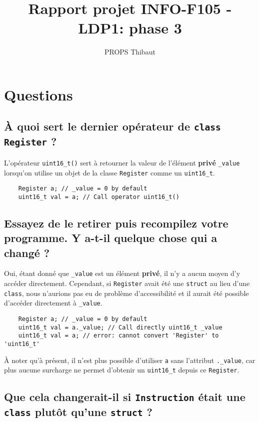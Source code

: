 \documentclass{article}
\title{Rapport projet INFO-F105 - LDP1: phase 3}
\author{PROPS Thibaut}
\date{}
\begin{document}
\maketitle

\section{Questions}

\subsection{À quoi sert le dernier opérateur de \texttt{class Register} ?}

L'opérateur \texttt{uint16_t()} sert à retourner la valeur de l'élément \textbf{privé} \texttt{\_value} lorsqu'on utilise un objet de la classe \texttt{Register} comme un \texttt{uint16_t}.

\begin{verbatim}
    Register a; // _value = 0 by default
    uint16_t val = a; // Call operator uint16_t()
\end{verbatim}

\subsection{Essayez de le retirer puis recompilez votre programme. Y a-t-il quelque chose qui a changé ?}

Oui, étant donné que \texttt{\_value} est un élément \textbf{privé}, il n'y a aucun moyen d'y accéder directement. Cependant, si \texttt{Register} avait été une \texttt{struct} au lieu d'une \texttt{class}, nous n'aurions pas eu de problème d'accessibilité et il aurait été possible d'accéder directement à \texttt{\_value}.

\begin{verbatim}
    Register a; // _value = 0 by default
    uint16_t val = a._value; // Call directly uint16_t _value
    uint16_t val = a; // error: cannot convert 'Register' to 'uint16_t'
\end{verbatim}

À noter qu'à présent, il n'est plus possible d'utiliser \texttt{a} sans l'attribut \texttt{.\_value}, car plus aucune surcharge ne permet d'obtenir un \texttt{uint16_t} depuis ce \texttt{Register}.

\subsection{Que cela changerait-il si \texttt{Instruction} était une \texttt{class} plutôt qu'une \texttt{struct} ?}
\end{document}
